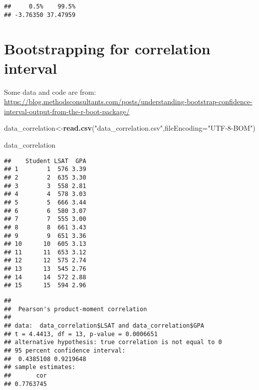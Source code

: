 \documentclass[]{book}
\newenvironment{Shaded}{\begin{snugshade}}{\end{snugshade}}
\newcommand{\DataTypeTok}[1]{\textcolor[rgb]{0.13,0.29,0.53}{#1}}
\newcommand{\KeywordTok}[1]{\textcolor[rgb]{0.13,0.29,0.53}{\textbf{#1}}}
\newcommand{\NormalTok}[1]{#1}
\newcommand{\OperatorTok}[1]{\textcolor[rgb]{0.81,0.36,0.00}{\textbf{#1}}}
\newcommand{\StringTok}[1]{\textcolor[rgb]{0.31,0.60,0.02}{#1}}
\begin{document}
\begin{verbatim}
##     0.5%    99.5% 
## -3.76350 37.47959
\end{verbatim}

\hypertarget{bootstrapping-for-correlation-interval}{%
\section{Bootstrapping for correlation interval}\label{bootstrapping-for-correlation-interval}}

Some data and code are from: \url{https://blog.methodsconsultants.com/posts/understanding-bootstrap-confidence-interval-output-from-the-r-boot-package/}

\begin{Shaded}
\begin{Highlighting}[]
\NormalTok{data_correlation<-}\KeywordTok{read.csv}\NormalTok{(}\StringTok{"data_correlation.csv"}\NormalTok{,}\DataTypeTok{fileEncoding=}\StringTok{"UTF-8-BOM"}\NormalTok{)}

\NormalTok{data_correlation}
\end{Highlighting}
\end{Shaded}

\begin{verbatim}
##    Student LSAT  GPA
## 1        1  576 3.39
## 2        2  635 3.30
## 3        3  558 2.81
## 4        4  578 3.03
## 5        5  666 3.44
## 6        6  580 3.07
## 7        7  555 3.00
## 8        8  661 3.43
## 9        9  651 3.36
## 10      10  605 3.13
## 11      11  653 3.12
## 12      12  575 2.74
## 13      13  545 2.76
## 14      14  572 2.88
## 15      15  594 2.96
\end{verbatim}

\begin{Shaded}
\end{Shaded}

\begin{verbatim}
## 
##  Pearson's product-moment correlation
## 
## data:  data_correlation$LSAT and data_correlation$GPA
## t = 4.4413, df = 13, p-value = 0.0006651
## alternative hypothesis: true correlation is not equal to 0
## 95 percent confidence interval:
##  0.4385108 0.9219648
## sample estimates:
##       cor 
## 0.7763745
\end{verbatim}
\end{document}
